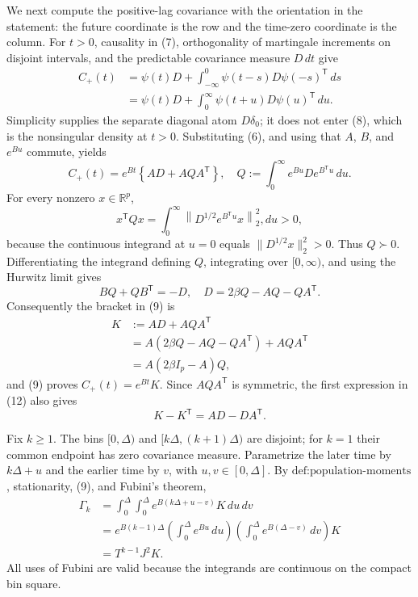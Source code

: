 We next compute the positive-lag covariance with the orientation in the statement: the future coordinate is the row and the time-zero coordinate is the column.  For \(t>0\), causality in (7), orthogonality of martingale increments on disjoint intervals, and the predictable covariance measure \(D\,dt\) give
\[
 \begin{aligned}
 C_{+}(t)
 &=\psi(t)D+
   \int_{-\infty}^{0}\psi(t-s)D\psi(-s)^{\mathsf T}\,ds\\
 &=\psi(t)D+\int_0^\infty\psi(t+u)D\psi(u)^{\mathsf T}\,du.
 \end{aligned}
\tag{8}
\]
Simplicity supplies the separate diagonal atom \(D\delta_0\); it does not enter (8), which is the nonsingular density at \(t>0\).  Substituting (6), and using that \(A\), \(B\), and \(e^{Bu}\) commute, yields
\[
 C_{+}(t)
 =e^{Bt}\left\{AD+AQA^{\mathsf T}\right\},\quad
 Q:=\int_0^\infty e^{Bu}De^{B^{\mathsf T}u}\,du.
\tag{9}
\]
For every nonzero \(x\in\mathbb R^p\),
\[
 x^{\mathsf T}Qx
 =\int_0^\infty
 \left\|D^{1/2}e^{B^{\mathsf T}u}x\right\|_2^2,du>0,
\tag{10}
\]
because the continuous integrand at \(u=0\) equals \(\|D^{1/2}x\|_2^2>0\).  Thus \(Q\succ0\).  Differentiating the integrand defining \(Q\), integrating over \([0,\infty)\), and using the Hurwitz limit gives
\[
 BQ+QB^{\mathsf T}=-D,\quad
 D=2\beta Q-AQ-QA^{\mathsf T}.
\tag{11}
\]
Consequently the bracket in (9) is
\[
 \begin{aligned}
 K&:=AD+AQA^{\mathsf T}\\
 &=A(2\beta Q-AQ-QA^{\mathsf T})+AQA^{\mathsf T}\\
 &=A(2\beta I_p-A)Q,
 \end{aligned}
\tag{12}
\]
and (9) proves \(C_{+}(t)=e^{Bt}K\).  Since \(AQA^{\mathsf T}\) is symmetric, the first expression in (12) also gives
\[
 K-K^{\mathsf T}=AD-DA^{\mathsf T}.
\tag{13}
\]

Fix \(k\geq1\).  The bins \([0,\Delta)\) and \([k\Delta,(k+1)\Delta)\) are disjoint; for \(k=1\) their common endpoint has zero covariance measure.  Parametrize the later time by \(k\Delta+u\) and the earlier time by \(v\), with \(u,v\in[0,\Delta]\).  By \(\text{def:population-moments}\), stationarity, (9), and Fubini's theorem,
\[
 \begin{aligned}
 \Gamma_k
 &=\int_0^\Delta\!\int_0^\Delta
 e^{B(k\Delta+u-v)}K\,du\,dv\\
 &=e^{B(k-1)\Delta}
 \left(\int_0^\Delta e^{Bu}\,du\right)
 \left(\int_0^\Delta e^{B(\Delta-v)}\,dv\right)K\\
 &=T^{k-1}J^2K.
 \end{aligned}
\tag{14}
\]
All uses of Fubini are valid because the integrands are continuous on the compact bin square.

